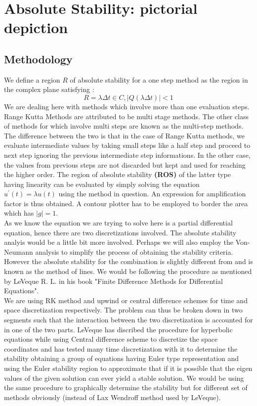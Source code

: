 \documentclass[a4paper,12pt]{report}
\begin{document}
\chapter{Absolute Stability: pictorial depiction}
\section{Methodology}
We define a region $R$ of absolute stability for a one step method as the region  in the complex plane satisfying :
\[R = {\lambda \Delta t \in C, |Q(\lambda \Delta t)|<1}\]
We are dealing here with methods which involve more than one evaluation steps. Range Kutta Methods are attributed to be multi stage methods. The other class of methods for which involve multi steps are known as the multi-step methods. The difference between the two is that in the case of Range Kutta methods, we evaluate intermediate values by taking small steps like a half step and proceed to next step ignoring the previous intermediate step informations. In the other case, the values from previous steps are not discarded but kept and used for reaching the higher order. The region of absolute stability \textbf{(ROS)} of the latter type having linearity can be evaluated by simply solving the equation $u^{\prime}(t)=\lambda u(t)$ using the method in question. An expression for amplification factor is thus obtained. A contour plotter has to be employed to border the area which has $|g| = 1$. \\
As we know the equation we are trying to solve here is a partial differential equation, hence there are two discretizations involved. The absolute stability analyis would be a little bit more involved. Perhaps we will also employ the Von-Neumann analysis to simplify the process of obtaining the stability criteria. However the absolute stability for the combination is slightly different from and is known as the method of lines. We would be following the procedure as mentioned by LeVeque R. L. in his book "Finite Difference Methods for Differential Equations". \\
We are using RK method and upwind or central difference schemes for time and space discretization respectively. The problem can thus be broken down in two segments such that the interaction between the two discretization is accounted for in one of the two parts. LeVeque has discribed the procedure for hyperbolic equations while using Central difference scheme to discretize the space coordinates and has tested many time discretization with it to determine the stability obtaining a group of equations having Euler type representation and using the Euler stability region to approximate that if it is possible that the eigen values of the given solution can ever yield a stable solution. We would be using the same procedure to graphically determine the stability but for different set of methods obviously (instead of Lax Wendroff method used by LeVeque). \\
\end{document}
